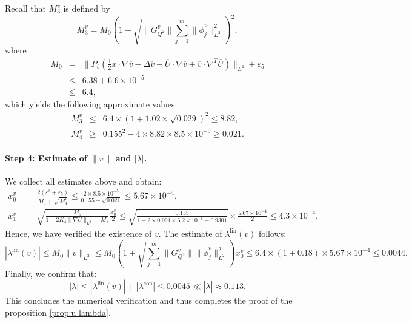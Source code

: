 \documentclass[11pt,a4paper]{article}
\numberwithin{equation}{section}
\newcommand{\cdummy}{\cdot}
\newcommand{\tmop}[1]{\ensuremath{\operatorname{#1}}}
\begin{document}
Recall that $M_3^v$ is defined by
\[ M_3^v = M_0  (1 +  \sqrt{ \| G_{Q^2}^v \|\sum_{j = 1}^m \| \overline{\phi}_j^v \|_{L^2}^2})^2, \]
where
\begin{eqnarray*}
M_0 &=& \|P_{\overline{v}} (\frac{1}{2} x \cdummy \nabla \overline{v} - \Delta \overline{v}
   - \overline{U} \cdot \nabla \overline{v} + \overline{v} \cdummy \nabla^T 
   \overline{U})\|_{L^2}+\varepsilon_5\\
   &\leqslant & 6.38 + 6.6 \times 10^{- 5}\\
   &\leqslant & 6.4,
\end{eqnarray*}
which yields the following approximate values:
\begin{eqnarray*}
  M_3^v & \leqslant & 6.4 \times (1 + 1.02 \times \sqrt{0.029})^2 \leqslant 8.82,\\
  M_4^v & \geqslant & 0.155^2 - 4 \times 8.82 \times 8.5 \times 10^{- 5}
  \geqslant 0.021.
\end{eqnarray*}

\paragraph{Step 4: Estimate of $\| v \|$ and $| \lambda |$.}

We collect all estimates above and obtain:
\begin{eqnarray*}
  x_0^v & = & \frac{2 (\varepsilon^{v}+\varepsilon_5)}{ M_5 + \sqrt{M_4^v}
  } \leqslant \frac{2 \times 8.5 \times 10^{- 5}}{ 0.155 +
  \sqrt{0.021} } \leqslant 5.67 \times 10^{- 4},\\
  x_1^v & = & \sqrt{\frac{M_5}{1 - 2 K_4 \| \nabla U\|_{L^2}- M_1^v}} 
  \frac{x_0^v}{2} \leqslant \sqrt{\frac{0.155}{1 - 2 \times 0.091 \times 6.2
  \times 10^{- 6} - 0.9301}} \times \frac{5.67 \times 10^{- 4}}{2} \leqslant 4.3
  \times 10^{- 4} .
\end{eqnarray*}
Hence, we have verified the existence of $v$. The estimate of
$\lambda^{\tmop{lin}} (v)$ follows:
\[
  | \lambda^{\tmop{lin}} (v) | \leqslant  M_0 \| v \|_{L^2} \leqslant M_0  (1 +
  \sqrt{ \sum_{j = 1}^m \| G_{Q^2}^v \| \|
  \overline{\phi}_j^v \|_{L^2}^2}) x_0^v
   \leqslant  6.4 \times (1 + 0.18) \times 5.67 \times 10^{- 4} \leqslant
  0.0044.
\]
Finally, we confirm that:
\[ | \lambda | \leqslant | \lambda^{\tmop{lin}} (v) | + | \lambda^{\tmop{con}}
   | \leqslant 0.0045 \ll | \overline{\lambda} | \approx 0.113. \]
This concludes the numerical verification and thus completes the proof of
the proposition \ref{prop:u lambda}.
\end{document}
